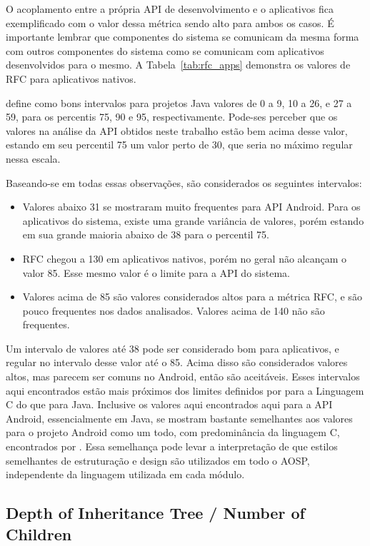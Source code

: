 O acoplamento entre a própria API de desenvolvimento e o aplicativos fica exemplificado com o valor dessa métrica sendo alto para ambos os casos. É importante lembrar que componentes do sistema se comunicam da mesma forma com outros componentes do sistema como se comunicam com aplicativos desenvolvidos para o mesmo. A Tabela~\ref{tab:rfc_apps} demonstra os valores de RFC para aplicativos nativos.

 define como bons intervalos para projetos Java valores de 0 a 9, 10 a 26, e 27 a 59, para os percentis 75, 90 e 95, respectivamente. Pode-ses perceber que os valores na análise da API obtidos neste trabalho estão bem acima desse valor, estando em seu percentil 75 um valor perto de 30, que seria no máximo regular nessa escala.

Baseando-se em todas essas observações, são considerados os seguintes intervalos:

\begin{itemize}
\item Valores abaixo 31 se mostraram muito frequentes para API Android. Para os aplicativos do sistema, existe uma grande variância de valores, porém estando em sua grande maioria abaixo de 38 para o percentil 75.
\item RFC chegou a 130 em aplicativos nativos, porém no geral não alcançam o valor 85. Esse mesmo valor é o limite para a API do sistema.
\item Valores acima de 85 são valores considerados altos para a métrica RFC, e são pouco frequentes nos dados analisados. Valores acima de 140 não são frequentes.
\end{itemize}

Um intervalo de valores até 38 pode ser considerado bom para aplicativos, e regular no intervalo desse valor até o 85. Acima disso são considerados valores altos, mas parecem ser comuns no Android, então são aceitáveis. Esses intervalos aqui encontrados estão mais próximos dos limites definidos por  para a Linguagem C do que para Java. Inclusive os valores aqui encontrados aqui para a API Android, essencialmente em Java, se mostram bastante semelhantes aos valores para o projeto Android como um todo, com predominância da linguagem C, encontrados por . Essa semelhança pode levar a interpretação de que estilos semelhantes de estruturação e design são utilizados em todo o AOSP, independente da linguagem utilizada em cada módulo.

\subsection{Depth of Inheritance Tree / Number of Children}

